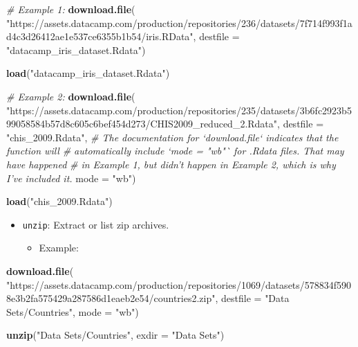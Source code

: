 \documentclass[]{book}
\newenvironment{Shaded}{\begin{snugshade}}{\end{snugshade}}
\newcommand{\CommentTok}[1]{\textcolor[rgb]{0.56,0.35,0.01}{\textit{#1}}}
\newcommand{\DataTypeTok}[1]{\textcolor[rgb]{0.13,0.29,0.53}{#1}}
\newcommand{\KeywordTok}[1]{\textcolor[rgb]{0.13,0.29,0.53}{\textbf{#1}}}
\newcommand{\NormalTok}[1]{#1}
\newcommand{\StringTok}[1]{\textcolor[rgb]{0.31,0.60,0.02}{#1}}
\providecommand{\tightlist}{%
  \setlength{\itemsep}{0pt}\setlength{\parskip}{0pt}}
\begin{document}
\begin{Shaded}
\begin{Highlighting}[]
\CommentTok{# Example 1:}
\KeywordTok{download.file}\NormalTok{(}
  \StringTok{"https://assets.datacamp.com/production/repositories/236/datasets/7f714f993f1ad4c3d26412ae1e537ce6355b1b54/iris.RData"}\NormalTok{, }
  \DataTypeTok{destfile =} \StringTok{"datacamp_iris_dataset.Rdata"}\NormalTok{)}

\KeywordTok{load}\NormalTok{(}\StringTok{"datacamp_iris_dataset.Rdata"}\NormalTok{)}

\CommentTok{# Example 2:}
\KeywordTok{download.file}\NormalTok{(}
  \StringTok{"https://assets.datacamp.com/production/repositories/235/datasets/3b6fc2923b599058584b57d8c605c6bef454d273/CHIS2009_reduced_2.Rdata"}\NormalTok{,}
  \DataTypeTok{destfile =} \StringTok{"chis_2009.Rdata"}\NormalTok{,}
  \CommentTok{# The documentation for `download.file` indicates that the function will}
  \CommentTok{# automatically include `mode = "wb"` for .Rdata files. That may have happened}
  \CommentTok{# in Example 1, but didn't happen in Example 2, which is why I've included it.}
  \DataTypeTok{mode =} \StringTok{"wb"}\NormalTok{)}

\KeywordTok{load}\NormalTok{(}\StringTok{"chis_2009.Rdata"}\NormalTok{)}
\end{Highlighting}
\end{Shaded}

\begin{itemize}
\tightlist
\item
  \texttt{unzip}: Extract or list zip archives.

  \begin{itemize}
  \tightlist
  \item
    Example:
  \end{itemize}
\end{itemize}

\begin{Shaded}
\begin{Highlighting}[]
\KeywordTok{download.file}\NormalTok{(}
  \StringTok{"https://assets.datacamp.com/production/repositories/1069/datasets/578834f5908e3b2fa575429a287586d1eaeb2e54/countries2.zip"}\NormalTok{,}
  \DataTypeTok{destfile =} \StringTok{"Data Sets/Countries"}\NormalTok{,}
  \DataTypeTok{mode =} \StringTok{"wb"}\NormalTok{)}

\KeywordTok{unzip}\NormalTok{(}\StringTok{"Data Sets/Countries"}\NormalTok{, }\DataTypeTok{exdir =} \StringTok{"Data Sets"}\NormalTok{)}
\end{Highlighting}
\end{Shaded}
\end{document}
